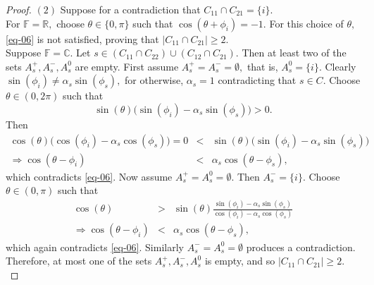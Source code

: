 \documentclass{amsart}
\theoremstyle{definition}
\theoremstyle{remark}
\numberwithin{equation}{section}
\begin{document}
\begin{proof}
$(2)$ 
Suppose for a contradiction that  $C_{11}\cap C_{21}= \{i\}.$ \\
For $\mathbb{F}=\mathbb{R},$  choose $\theta\in \{0,\pi\}$ such that $\cos(\theta+\phi_i)=-1.$ For this choice of $\theta,$ \eqref{eq-06} is not satisfied, proving that   $|C_{11}\cap C_{21}|\geq 2.$\\
Suppose $\mathbb{F}=\mathbb{C}.$ Let $s\in(C_{11}\cap C_{22})\cup (C_{12}\cap C_{21}).$ Then at least two of the sets $A_s^+,A_s^-,A_s^0$ are empty. First assume $A_s^+=A_s^-=\emptyset,$ that is, $A_s^0=\{i\}.$ Clearly $\sin(\phi_i)\neq \alpha_s\sin(\phi_s),$ for otherwise, $\alpha_s=1$ contradicting that $s\in C.$ 
Choose $\theta\in(0,2\pi)$ such that $$\sin(\theta)\Big(\sin(\phi_i)-\alpha_s\sin(\phi_s)\Big)>0 .$$ Then  
\begin{eqnarray*}
	\cos(\theta)\Big(\cos(\phi_i)-\alpha_s \cos(\phi_s)\Big)=0&<&\sin(\theta) \Big(\sin(\phi_i)-\alpha_s \sin(\phi_s)\Big)\\
	\Rightarrow \cos(\theta-\phi_i)&<&\alpha_s\cos(\theta-\phi_s), %
\end{eqnarray*} 
which contradicts \eqref{eq-06}.  Now assume $A_s^+=A_s^0=\emptyset.$ Then $A_s^-=\{i\}.$ Choose $\theta\in (0,\pi)$ such that 
\begin{eqnarray*}
	\cos(\theta)&>& \sin(\theta) \frac{\sin(\phi_i)-\alpha_s \sin(\phi_s)}{\cos(\phi_i)-\alpha_s \cos(\phi_s)}\\
	\Rightarrow \cos(\theta-\phi_i)&<&\alpha_s\cos(\theta-\phi_s),%
\end{eqnarray*}
which again contradicts \eqref{eq-06}. Similarly $A_s^-=A_s^0=\emptyset$ produces a contradiction. Therefore, at most one of the sets $A_s^+,A_s^-,A_s^0$ is empty, and so $|C_{11}\cap C_{21}|\geq 2.$\\

\end{proof}
\end{document}
